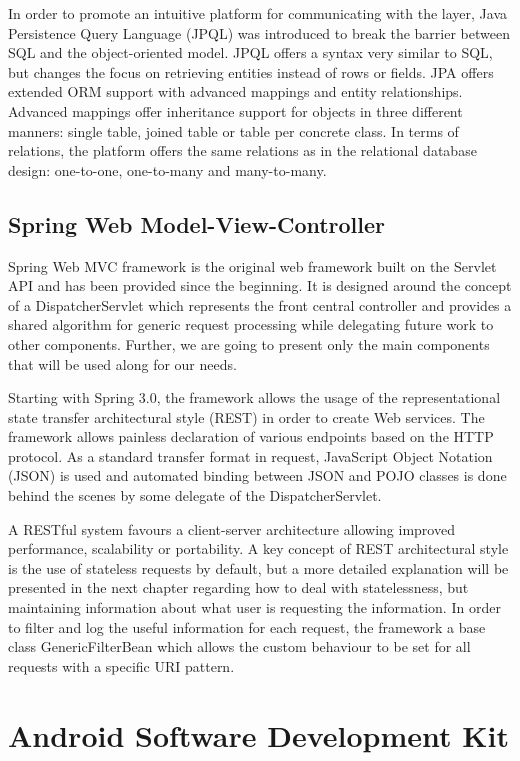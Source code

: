 In order to promote an intuitive platform for communicating with the layer, Java Persistence Query Language (JPQL) was introduced to break the barrier between SQL and the object-oriented model. JPQL offers a syntax very similar to SQL, but changes the focus on retrieving entities instead of rows or fields. JPA offers extended ORM support with advanced mappings and entity relationships. Advanced mappings offer inheritance support for objects in three different manners: single table, joined table or table per concrete class. In terms of relations, the platform offers the same relations as in the relational database design: one-to-one, one-to-many and many-to-many.

\subsection*{Spring Web Model-View-Controller}

Spring Web MVC framework is the original web framework built on the Servlet API and has been provided since the beginning. It is designed around the concept of a DispatcherServlet which represents the front central controller and provides a shared algorithm for generic request processing while delegating future work to other components. Further, we are going to present only the main components that will be used along for our needs.

Starting with Spring 3.0, the framework allows the usage of the representational state transfer architectural style (REST) in order to create Web services. The framework allows painless declaration of various endpoints based on the HTTP protocol. As a standard transfer format in request, JavaScript Object Notation (JSON) is used and automated binding between JSON and POJO classes is done behind the scenes by some delegate of the DispatcherServlet.

A RESTful system favours a client-server architecture allowing improved performance, scalability or portability. A key concept of REST architectural style is the use of stateless requests by default, but a more detailed explanation will be presented in the next chapter regarding how to deal with statelessness, but maintaining information about what user is requesting the information. In order to filter and log the useful information for each request, the framework a base class GenericFilterBean which allows the custom behaviour to be set for all requests with a specific URI pattern.


\section{Android Software Development Kit}

